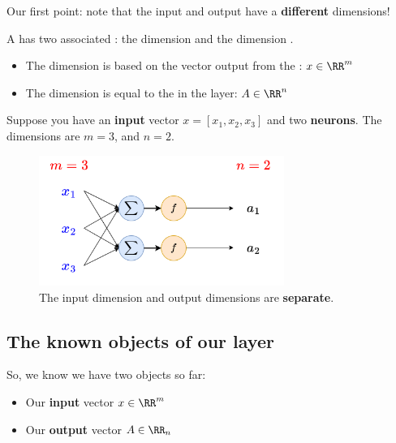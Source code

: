         Our first point: note that the input and output have a \textbf{different} dimensions!\\
        
        \begin{notation}
            A  has two associated : the  dimension  and the  dimension .
            
            \begin{itemize}
                \item The  dimension  is based on the vector output from the : $x \in \RR^m$
                
                \item The  dimension  is equal to the  in the  layer: $A \in \RR^n$
            \end{itemize}
        \end{notation}
        
        \miniex Suppose you have an \textbf{input} vector $x=[x_1, x_2, x_3]$ and two \textbf{neurons}. The dimensions are $m=3$, and $n=2$.
    
        \begin{figure}[H]
            \centering
            \includegraphics[width=80mm,scale=0.4]{images/nn_images/dimensions_network.png}
            \caption*{The input dimension and output dimensions are \textbf{separate}.}
        \end{figure}
        
    \subsection{The known objects of our layer}
    
        So, we know we have two objects so far:
        
        \begin{itemize}
            \item Our \textbf{input} vector $x \in \RR^m$
            
            \item Our \textbf{output} vector $A \in \RR_n$

        \end{itemize}
        
